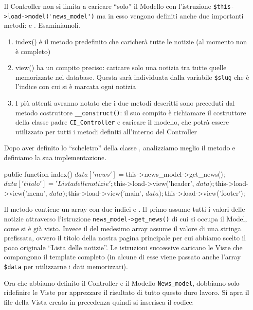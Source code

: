 Il Controller non si limita a caricare ``solo'' il Modello con l'istruzione \verb|$this->load->model('news_model')| ma in esso vengono definiti anche due importanti metodi:  e . Esaminiamoli.

\begin{enumerate}
\item index() è il metodo predefinito che caricherà tutte le notizie (al momento non è completo)
\item view() ha un compito preciso: caricare solo una notizia tra tutte quelle memorizzate nel database. Questa sarà individuata dalla variabile \verb|$slug| che è l'indice con cui si è marcata ogni notizia
\item I più attenti avranno notato che i due metodi descritti sono preceduti dal metodo costruttore \verb|__construct()|: il suo compito è richiamare il costruttore della classe padre \verb|CI_Controller| e caricare il modello, che potrà essere utilizzato per tutti i metodi definiti all'interno del Controller
\end{enumerate}

Dopo aver definito lo ``scheletro'' della classe , analizziamo meglio il metodo  e definiamo la sua implementazione.

\begin{code}
public function index()
{
	$data['news'] = $this->news_model->get_news();
	$data['titolo'] = 'Lista delle notizie';

	$this->load->view('header', $data);
	$this->load->view('menu', $data);
	$this->load->view('main', $data);
	$this->load->view('footer');
}
\end{code}

Il metodo contiene un array  con due indici  e . Il primo assume tutti i valori delle notizie attraverso l'istruzione \verb|news_model->get_news()| di cui si occupa il Model, come si è già visto. Invece il  del medesimo array assume il valore di una stringa prefissata, ovvero il titolo della nostra pagina principale per cui abbiamo scelto il poco originale ``Lista delle notizie''. Le istruzioni successive caricano le Viste che compongono il template completo (in alcune di esse viene passato anche l'array \verb|$data| per utilizzarne i dati memorizzati).

Ora che abbiamo definito il Controller e il Modello \verb|News_model|, dobbiamo solo ridefinire le Viste per apprezzare il risultato di tutto questo duro lavoro. Si apra il file della Vista creata in precedenza  quindi si inserisca il codice:


